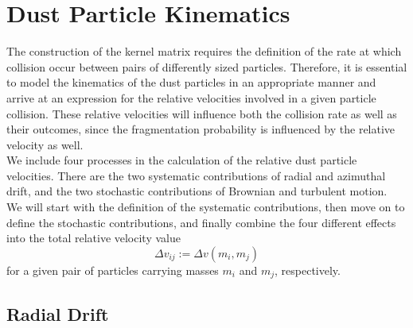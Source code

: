 

\clearpage\section{Dust Particle Kinematics}

    The construction of the kernel matrix requires the definition of the rate at which collision 
    occur between pairs of differently sized particles.
    Therefore, it is essential to model the kinematics of the dust particles in an appropriate
    manner and arrive at an expression for the relative velocities involved in a given particle
    collision.
    These relative velocities will influence both the collision rate as well as their outcomes, 
    since the fragmentation probability is influenced by the relative velocity as well. \\

    We include four processes in the calculation of the relative dust particle velocities.
    There are the two systematic contributions of radial and azimuthal drift, 
    and the two stochastic contributions of Brownian and turbulent motion. \\

    We will start with the definition of the systematic contributions, then move on to define 
    the stochastic contributions, and finally combine the four different effects into the 
    total relative velocity value 
    \begin{equation}
        \Delta v_{ij} := \Delta v( m_i, m_j)
    \end{equation}
    for a given pair of particles carrying masses $m_i$ and $m_j$, respectively. 


    \subsection{Radial Drift}

